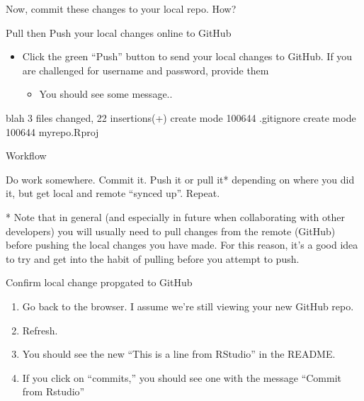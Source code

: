\documentclass[
  ignorenonframetext,
]{beamer}
\newenvironment{Shaded}{\begin{snugshade}}{\end{snugshade}}
\newcommand{\ExtensionTok}[1]{#1}
\newcommand{\NormalTok}[1]{#1}
\providecommand{\tightlist}{%
  \setlength{\itemsep}{0pt}\setlength{\parskip}{0pt}}
\begin{document}
\begin{frame}[fragile]{Now, commit these changes to your local repo.
How?}
\begin{block}{Pull then Push your local changes online to GitHub}
\begin{itemize}
\tightlist
\item
  Click the green ``Push'' button to send your local changes to GitHub.
  If you are challenged for username and password, provide them

  \begin{itemize}
  \tightlist
  \item
    You should see some message..
  \end{itemize}
\end{itemize}

\begin{Shaded}
\begin{Highlighting}[]
\NormalTok{[}\ExtensionTok{master}\NormalTok{ dc671f0] blah}
 \ExtensionTok{3}\NormalTok{ files changed, 22 insertions(+)}
 \ExtensionTok{create}\NormalTok{ mode 100644 .gitignore}
 \ExtensionTok{create}\NormalTok{ mode 100644 myrepo.Rproj}
\end{Highlighting}
\end{Shaded}

\end{block}

\end{frame}

\begin{frame}{Workflow}
\protect\hypertarget{workflow}{}

Do work somewhere. Commit it. Push it or pull it* depending on where you
did it, but get local and remote ``synced up''. Repeat.

* Note that in general (and especially in future when collaborating with
other developers) you will usually need to pull changes from the remote
(GitHub) before pushing the local changes you have made. For this
reason, it's a good idea to try and get into the habit of pulling before
you attempt to push.

\end{frame}

\begin{frame}{Confirm local change propgated to GitHub}
\protect\hypertarget{confirm-local-change-propgated-to-github}{}

\begin{enumerate}
\item
  Go back to the browser. I assume we're still viewing your new GitHub
  repo.
\item
  Refresh.
\item
  You should see the new ``This is a line from RStudio'' in the README.
\item
  If you click on ``commits,'' you should see one with the message
  ``Commit from Rstudio''
\end{enumerate}

\end{frame}
\end{document}
